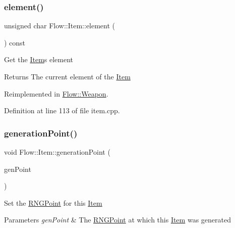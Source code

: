 \subsubsection{\texorpdfstring{element()}{element()}\hspace{0.1cm}{\footnotesize\ttfamily [2/2]}}
{\footnotesize\ttfamily unsigned char Flow\+::\+Item\+::element (\begin{DoxyParamCaption}{ }\end{DoxyParamCaption}) const\hspace{0.3cm}{\ttfamily [virtual]}}

Get the \hyperlink{class_flow_1_1_item}{Item}\textquotesingle{}s element \begin{DoxyReturn}{Returns}
The current element of the \hyperlink{class_flow_1_1_item}{Item} 
\end{DoxyReturn}


Reimplemented in \hyperlink{class_flow_1_1_weapon_a7bf5d4c7fe9132615ae906c1992e3e53}{Flow\+::\+Weapon}.



Definition at line 113 of file item.\+cpp.

\hypertarget{class_flow_1_1_item_a0cde312c43e4807d994a84aa28711629}{}\label{class_flow_1_1_item_a0cde312c43e4807d994a84aa28711629} 
\subsubsection{\texorpdfstring{generation\+Point()}{generationPoint()}\hspace{0.1cm}{\footnotesize\ttfamily [1/2]}}
{\footnotesize\ttfamily void Flow\+::\+Item\+::generation\+Point (\begin{DoxyParamCaption}\item[{const \hyperlink{struct_flow_1_1_r_n_g_point}{R\+N\+G\+Point} \&}]{gen\+Point }\end{DoxyParamCaption})}

Set the \hyperlink{struct_flow_1_1_r_n_g_point}{R\+N\+G\+Point} for this \hyperlink{class_flow_1_1_item}{Item} 
\begin{DoxyParams}{Parameters}
{\em gen\+Point} & The \hyperlink{struct_flow_1_1_r_n_g_point}{R\+N\+G\+Point} at which this \hyperlink{class_flow_1_1_item}{Item} was generated \\
\hline
\end{DoxyParams}


